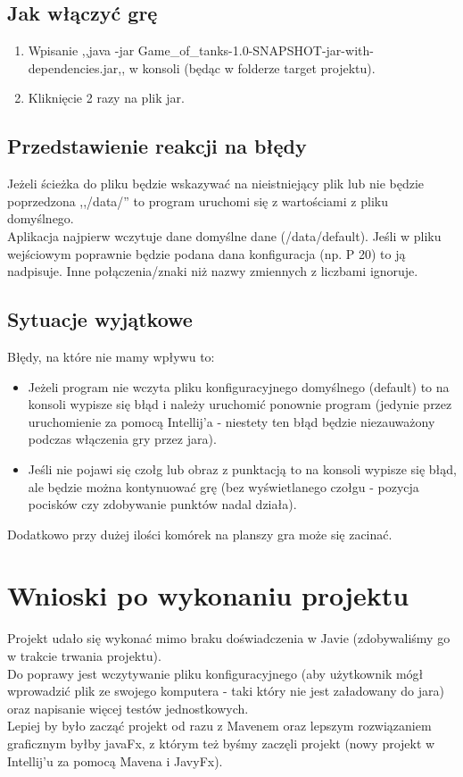 \documentclass{article}
\begin{document}
\subsection{Jak włączyć grę}
\begin{enumerate}
    \item Wpisanie ,,java -jar Game\_of\_tanks-1.0-SNAPSHOT-jar-with-dependencies.jar,, w konsoli (będąc w folderze target projektu).
    \item Kliknięcie 2 razy na plik jar.
\end{enumerate}

\subsection{Przedstawienie reakcji na błędy}
Jeżeli ścieżka do pliku będzie wskazywać na nieistniejący plik lub nie będzie poprzedzona ,,/data/'' to program uruchomi się z wartościami z pliku domyślnego.\\
Aplikacja najpierw wczytuje dane domyślne dane (/data/default). Jeśli w pliku wejściowym poprawnie będzie podana dana konfiguracja (np. P 20) to ją nadpisuje. Inne połączenia/znaki niż nazwy zmiennych z liczbami ignoruje.

\subsection{Sytuacje wyjątkowe}
Błędy, na które nie mamy wpływu to:
\begin{itemize}
    \item Jeżeli program nie wczyta pliku konfiguracyjnego domyślnego (default) to na konsoli wypisze się błąd i należy uruchomić ponownie program (jedynie przez uruchomienie za pomocą Intellij'a - niestety ten błąd będzie niezauważony podczas włączenia gry przez jara).
    \item Jeśli nie pojawi się czołg lub obraz z punktacją to na konsoli wypisze się błąd, ale będzie można kontynuować grę (bez wyświetlanego czołgu - pozycja pocisków czy zdobywanie punktów nadal działa).
\end{itemize}
\par Dodatkowo przy dużej ilości komórek na planszy gra może się zacinać.

\section{Wnioski po wykonaniu projektu}
Projekt udało się wykonać mimo braku doświadczenia w Javie (zdobywaliśmy go w trakcie trwania projektu). \\
Do poprawy jest wczytywanie pliku konfiguracyjnego (aby użytkownik mógł wprowadzić plik ze swojego komputera - taki który nie jest załadowany do jara) oraz napisanie więcej testów jednostkowych. \\
Lepiej by było zacząć projekt od razu z Mavenem oraz lepszym rozwiązaniem graficznym byłby javaFx, z którym też byśmy zaczęli projekt (nowy projekt w Intellij'u za pomocą Mavena i JavyFx).
\end{document}
